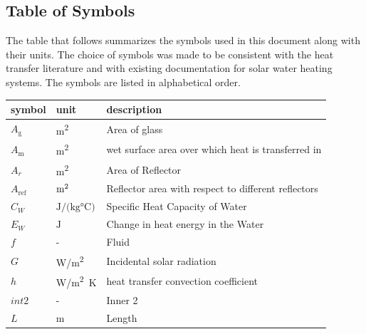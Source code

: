 \documentclass[12pt]{article}
\begin{document}
\subsection{Table of Symbols}

The table that follows summarizes the symbols used in this document along with
their units.  The choice of symbols was made to be consistent with the heat
transfer literature and with existing documentation for solar water heating
systems.  The symbols are listed in alphabetical order.

\renewcommand{\arraystretch}{1.2}
\noindent \begin{longtable*}{l l p{12cm}} \toprule
\textbf{symbol} & \textbf{unit} & \textbf{description}\\
\midrule 

$A_\text{g}$ & \si[per-mode=symbol] {\square\metre} & Area of glass
\\ 

$A_\text{m}$ & \si[per-mode=symbol] {\square\metre} & wet surface area over which heat is transferred in
\\ 

$A_r$ & \si[per-mode=symbol] {\square\metre} & Area of Reflector
\\



$A_\text{ref}$ & $\si[per-mode=symbol] {\square\metre} $ & Reflector area with respect to different reflectors \\

$C_W$ & $\si{\joule\per(\kilogram \celsius)}$ & Specific Heat Capacity of Water \\

$E_W$ & $\si{\joule}$ & Change in heat energy in the Water \\

$f$ & - & Fluid \\

$G$ & \si[per-mode=symbol]{\watt\per\square\metre} & Incidental solar radiation \\

$h$ & \si[per-mode=symbol]{\watt\per\square\metre K} & heat transfer convection coefficient \\

$int2$ & - & Inner 2  \\

$L$ & \si{\metre} & Length \\


\end{longtable*}
\end{document}
